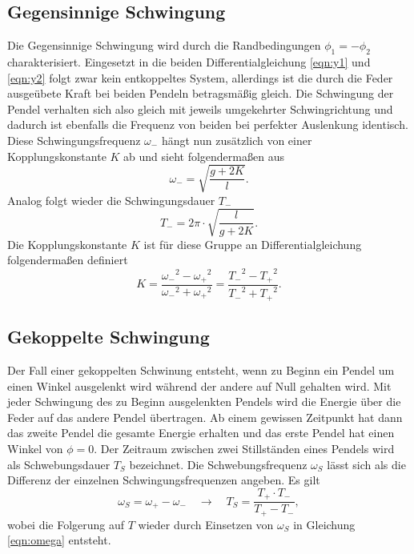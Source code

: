 \subsection{Gegensinnige Schwingung}
Die Gegensinnige Schwingung wird durch die Randbedingungen $\phi_{1} = -\phi_{2}$ charakterisiert. Eingesetzt in die beiden Differentialgleichung \eqref{eqn:y1} und \eqref{eqn:y2} folgt zwar kein entkoppeltes
System, allerdings ist die durch die Feder ausgeübete Kraft bei beiden Pendeln betragsmäßig gleich. Die Schwingung der Pendel verhalten sich also gleich mit jeweils umgekehrter Schwingrichtung und dadurch ist ebenfalls
die Frequenz von beiden bei perfekter Auslenkung identisch.
Diese Schwingungsfrequenz $\omega_{-}$ hängt nun zusätzlich von einer Kopplungskonstante $K$ ab und sieht folgendermaßen aus
\begin{equation}
\omega_{-} = \sqrt{\frac{g+2K}{l}}.
\end{equation}
Analog folgt wieder die Schwingungsdauer $T_{-}$
\begin{equation}
    T_{-} = 2\pi \cdot \sqrt{\frac{l}{g+2K}}.
\end{equation}
Die Kopplungskonstante $K$ ist für diese Gruppe an Differentialgleichung folgendermaßen definiert
\begin{equation}
    K = \frac{{\omega_{-}}^2 - {\omega_{+}}^2}{{\omega_{-}}^2 + {\omega_{+}}^2} = \frac{{T_{-}}^2 - {T_{+}}^2}{{T_{-}}^2 + {T_{+}}^2}.
\end{equation}

\subsection{Gekoppelte Schwingung}
Der Fall einer gekoppelten Schwinung entsteht, wenn zu Beginn ein Pendel um einen Winkel ausgelenkt wird während der andere auf Null gehalten wird. Mit jeder Schwingung des zu Beginn ausgelenkten Pendels
wird die Energie über die Feder auf das andere Pendel übertragen. Ab einem gewissen Zeitpunkt hat dann das zweite Pendel die gesamte Energie erhalten und das erste Pendel hat einen Winkel von $\phi = 0$. Der Zeitraum
zwischen zwei Stillständen eines Pendels wird als Schwebungsdauer $T_{S}$ bezeichnet. Die Schwebungsfrequenz $\omega_{S}$ lässt sich als die Differenz der einzelnen Schwingungsfrequenzen angeben. Es gilt 
\begin{equation}
\omega_{S} = \omega_{+} - \omega_{-} \quad \to \quad T_{S} = \frac{T_{+} \cdot T_{-}}{T_{+} - T_{-}},
\end{equation}
wobei die Folgerung auf $T$ wieder durch Einsetzen von $\omega_{S}$ in Gleichung \ref{eqn:omega} entsteht.